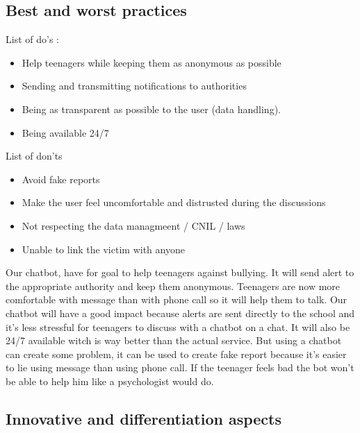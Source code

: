 \documentclass{article}
\begin{document}
\newpage

\subsection{Best and worst practices}


List of do's :

\begin{itemize}
\item Help teenagers while keeping them as anonymous as possible
\item Sending and transmitting notifications to authorities
\item Being as transparent as possible to the user (data handling).
\item Being available 24/7
\end{itemize}

\medskip

List of don'ts 

\begin{itemize}
\item Avoid fake reports 
\item Make the user feel uncomfortable and distrusted during the discussions
\item Not respecting the data managmeent / CNIL / laws
\item Unable to link the victim with anyone
\end{itemize}

Our chatbot, have for goal to help teenagers against bullying. It will send alert to the appropriate authority and keep them anonymous. Teenagers are now more comfortable with message than with phone call so it will help them to talk.
Our chatbot will have a good impact because alerts are sent directly to the school and it's less stressful for teenagers to discuss with a chatbot on a chat. It will also be 24/7 available witch is way better than the actual service.
But using a chatbot can create some problem, it can be used to create fake report because it's easier to lie using message than using phone call. If the teenager feels bad the bot won't be able to help him like a psychologist would do.

\subsection{Innovative and differentiation aspects}
\end{document}
